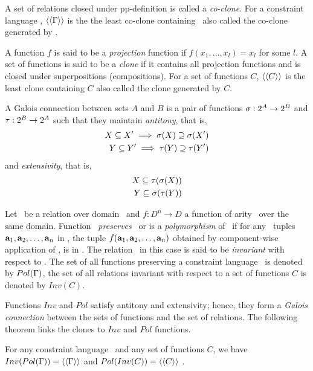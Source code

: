 A set of relations closed under pp-definition is called a \emph{co-clone}.
For a constraint language \mrelset, \(\langle\langle \Gamma \rangle\rangle\) is the the least co-clone containing
\mrelset\ also called the co-clone generated by \mrelset\@.

A function \(f\) is said to be a \emph{projection} function if \(f(x_1,\dotsc,x_l)=x_l\) 
for some \(l\)\@.
A set of functions is said to be a \emph{clone} if it contains all projection
functions and is closed under superpositions (compositions). For a set of functions
\(C\), \(\langle\langle C \rangle\rangle\) is the least clone containing \(C\) also called the clone generated by \(C\)\@.

A Galois connection between sets \(A\) and \(B\) is a pair of functions
\(\sigma:2^{A} \to 2^{B}\) and \(\tau:2^{B} \to 2^{A}\) 
such that they maintain {\em antitony}, that is,
\begin{align*}
X \subseteq X' \implies \sigma(X) \supseteq \sigma(X') \\
Y \subseteq Y' \implies \tau(Y) \supseteq \tau(Y') \\
\end{align*}
and {\em extensivity}, that is,
\begin{align*}
X \subseteq \tau(\sigma(X)) \\
Y \subseteq \sigma(\tau(Y))
\end{align*}

Let \mR\ be a relation over domain \mD\ and \(f:D^n\to D\) a function of arity \mn\ over the
same domain. Function \mf\ \emph{preserves} \mR\ or is a \emph{polymorphism} of \mR\ if
for any \mn\ tuples \(\textbf{a}_1,\textbf{a}_2,\dotsc,\textbf{a}_n\) in \mR, the tuple
\(f(\textbf{a}_1,\textbf{a}_2,\dotsc,\textbf{a}_n)\) obtained by component-wise application of \mf,
is in \mR\@. The relation \mR\ in this case is said to be \emph{invariant} with respect 
to \mf\@.
The set of all functions preserving a constraint language \mrelset\ is 
denoted by \(Pol(\Gamma)\), the set of all relations invariant with respect to a set of
functions  \(C\) is denoted by \(Inv(C)\)\@.

Functions \(Inv\) and \(Pol\) satisfy antitony and extensivity; hence, they 
form a \emph{Galois connection} between the sets of functions 
and the set of relations. The following theorem links the clones to \(Inv\) and \(Pol\)
functions.

\begin{theorem}
For any constraint language \mrelset\ and 
any set of functions \(C\), 
we have \(Inv(Pol(\Gamma))=\langle\langle \Gamma \rangle\rangle\)
and
\(Pol(Inv(C))=\langle\langle C \rangle\rangle\)
\@.
\end{theorem}

